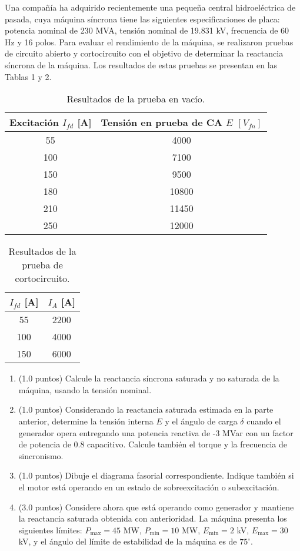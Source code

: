 
Una compañía ha adquirido recientemente una pequeña central hidroeléctrica de pasada, cuya máquina síncrona tiene las siguientes especificaciones de placa: potencia nominal de 230 MVA, tensión nominal de 19.831 kV, frecuencia de 60 Hz y 16 polos. Para evaluar el rendimiento de la máquina, se realizaron pruebas de circuito abierto y cortocircuito con el objetivo de determinar la reactancia síncrona de la máquina. Los resultados de estas pruebas se presentan en las Tablas 1 y 2.

\begin{table}[h!]
\centering
\begin{tabular}{|c|c|}
\hline
Excitación $I_{fd}$ [A] & Tensión en prueba de CA $E$ $[V_{fn}]$  \\
\hline
55 & 4000 \\
100 & 7100 \\
150 & 9500 \\
180 & 10800 \\
210 & 11450 \\
250 & 12000 \\
\hline
\end{tabular}
\caption{Resultados de la prueba en vacío.}
\end{table}

\begin{table}[h!]
\centering
\begin{tabular}{|c|c|}
\hline
$I_{fd}$ [A] & $I_A$ [A] \\
\hline
55 & 2200 \\
100 & 4000 \\
150 & 6000 \\
\hline
\end{tabular}
\caption{Resultados de la prueba de cortocircuito.}
\end{table}

\begin{enumerate}
    \item (1.0 puntos) Calcule la reactancia síncrona saturada y no saturada de la máquina, usando la tensión nominal.
    \item (1.0 puntos) Considerando la reactancia saturada estimada en la parte anterior, determine la tensión interna $E$ y el ángulo de carga $\delta$ cuando el generador opera entregando una potencia reactiva de -3 MVar con un factor de potencia de 0.8 capacitivo. Calcule también el torque y la frecuencia de sincronismo.
    \item (1.0 puntos) Dibuje el diagrama fasorial correspondiente. Indique también si el motor está operando en un estado de sobreexcitación o subexcitación.
    \item (3.0 puntos) Considere ahora que está operando como generador y mantiene la reactancia saturada obtenida con anterioridad. La máquina presenta los siguientes límites: $P_{\text{max}} = 45$ MW, $P_{\text{min}} = 10$ MW, $E_{\text{min}} = 2$ kV, $E_{\text{max}} = 30$ kV, y el ángulo del límite de estabilidad de la máquina es de $75^{\circ}$.
\end{enumerate}
\newpage

